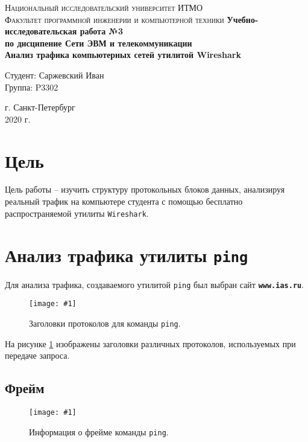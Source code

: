 \documentclass[12pt, a4paper]{article}
\newcommand{\figc}[4]{
  \begin{figure}[H]
  \begin{center}
    \texttt{[image: \#1]}
    \caption{#2}
    \label{fig:#3}
  \end{center}
  \end{figure}
}
\begin{document}
\begin{titlepage}
\begin{center}

\textsc{Национальный исследовательский университет ИТМО\\[4mm]
Факультет программной инженерии и компьютерной техники}
\vfill
\textbf{Учебно-исследовательская работа №3\\[4mm]
по дисципение Сети ЭВМ и телекоммуникации\\[4mm]
Анализ трафика компьютерных сетей утилитой Wireshark\\[16mm]
}
\begin{flushright}
Студент: Саржевский Иван
\\[2mm]Группа: P3302
\end{flushright}
\vfill
г. Санкт-Петербург\\[2mm]
2020 г.

\end{center}
\end{titlepage}

\tableofcontents
\newpage

\justify

\section{Цель}

Цель работы – изучить структуру протокольных блоков данных, анализируя реальный
трафик на компьютере студента с помощью бесплатно распространяемой утилиты
\texttt{Wireshark}.

\section{Анализ трафика утилиты \texttt{ping}}

Для анализа трафика, создаваемого утилитой \texttt{ping} был выбран сайт
\textbf{\texttt{www.ias.ru}}.

\figc{ping_headers}{Заголовки протоколов для команды \texttt{ping}.}{p_h}{3.0}

На рисунке \ref{fig:p_h} изображены заголовки различных протоколов, используемых
при передаче запроса.

\subsection{Фрейм}

\figc{ping_frame}{Информация о фрейме команды \texttt{ping}.}{p_f}{3.0}
\end{document}
